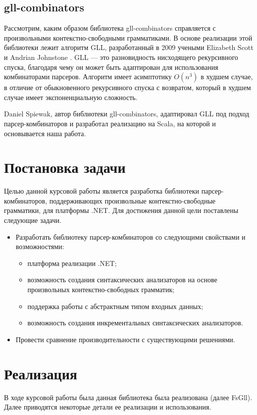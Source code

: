 \documentclass[14pt]{matmex-diploma}
\begin{document}
\subsection{gll-combinators}
Рассмотрим, каким образом библиотека gll-combinators справляется с произвольными контекстно-свободными грамматиками.
В основе реализации этой библиотеки лежит алгоритм GLL, 
  разработанный в 2009 учеными Elizabeth Scott и Andrian Johnstone \cite{gllsj}. 
GLL --- это разновидность нисходящего рекурсивного спуска, 
  благодаря чему он может быть адаптирован для использования комбинаторами парсеров. 
Алгоритм имеет асимптотику  $O(n^3)$ в худшем случае, в отличие от обыкновенного 
  рекурсивного спуска с возвратом, который в худшем случае имеет экспоненциальную сложность.
  
Daniel Spiewak, автор библиотеки gll-combinators, адаптировал  GLL 
  под подход парсер-комбинаторов и разработал реализацию на Scala, на которой и основывается наша работа. 
  


\section{Постановка задачи}
Целью данной курсовой работы является разработка библиотеки парсер-комбинаторов,
поддерживающих произвольные контекстно-свободные грамматики, для платформы .NET.
Для достижения данной цели поставлены следующие задачи.
\begin{itemize}
    \item Разработать библиотеку парсер-комбинаторов со следующими свойствами и возможностями:
    \begin{itemize}
        \item платформа реализации .NET;
        \item возможность создания синтаксических анализаторов на основе произвольных контекстно-свободных грамматик;
        \item поддержка работы с абстрактным типом входных данных;
        \item возможность создания инкрементальных синтаксических анализаторов.
    \end{itemize}
    \item Провести сравнение производительности с существующими решениями.
\end{itemize}


\section{Реализация}
В ходе курсовой работы была данная библиотека была реализована (далее FsGll). Далее приводятся некоторые детали ее реализации и использования.
\end{document}
